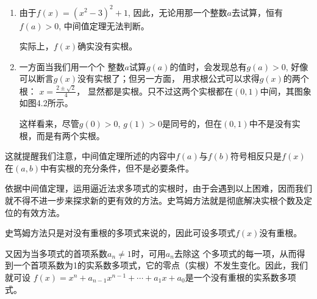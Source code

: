 \begin{solution}
\begin{enumerate}
    \item 由于$f(x)=(x^2-3)^2+1$, 因此，无论用那一个整数$a$去试算，恒有$f(a)>0$, 中间值定理无法判断。
    
    实际上，$f(x)$确实没有实根。
    \item 一方面当我们用一个个
    整数$a$试算$g(a)$的值时，会发现总有$g(a)>0$, 好像可以断言$g(x)$没有实根了；但另一方面，
    用求根公式可以求得$g(x)$的两个根：
    $x=\frac{2\pm\sqrt{2}}{4}$，
    显然都是实根。只不过这两个实根都在$(0, 1)$中间，其图象如图4.2所示。

    这样看来，尽管$g(0)>0$, $g(1)>0$是同号的，但在$(0, 1)$中不是没有实根，而是有两个实根。
\end{enumerate}

\begin{figure}[htp]
    \centering
{}
    \caption{}
\end{figure}
\end{solution}

这就提醒我们注意，中间值定理所述的内容中$f(a)$与$f(b)$符号相反只是$f(x)$在$(a,b)$中有实根的充分条件，但不是必要条件。
    
    依据中间值定理，运用逼近法求多项式的实根时，由于会遇到以上困难，因而我们就不得不进一步来探求新的更有效的方法。史笃姆方法就是彻底解决实根个数及定位的有效方法。
    
    史笃姆方法只是对没有重根的多项式来说的，因此可设多项式$f(x)$没有重根。

又因为当多项式的首项系数$a_n\ne 1$时，可用$a_n$去除这
个多项式的每一项，从而得到一个首项系数为1的实系数多项式，它的零点（实根）不发生变化。因此，我们就可设
$f (x) =x^n+a_{n-1}x^{n-1}+\cdots +a_1x +a_0$是一个没有重根的实系数多项式。

\begin{example}
    
\end{example}

\begin{solution}
    
\end{solution}


